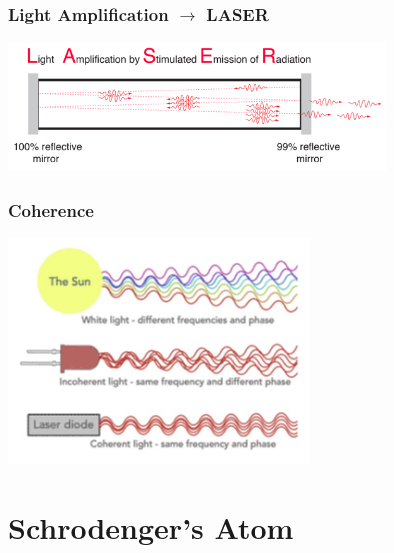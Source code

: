 \documentclass{beamer}
\begin{document}
\begin{frame}\frametitle{Light Amplification $\rightarrow$ LASER}
\begin{center}
\includegraphics[width=10cm]{fig/laser2.png}
\end{center}
\end{frame}

\begin{frame}\frametitle{Coherence}
\begin{center}
\includegraphics[width=8cm]{fig/laser3.jpg}
\end{center}
\end{frame}


\section{Schrodenger's Atom}
\end{document}
